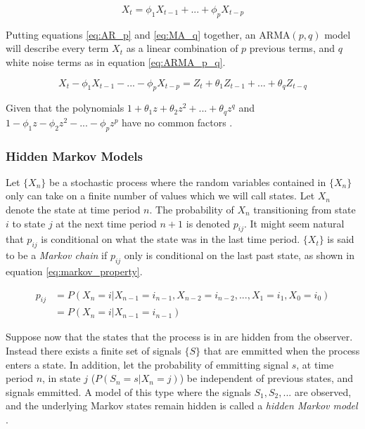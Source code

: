 \begin{equation}
    X_t = \phi_1 X_{t-1} + ... + \phi_p X_{t-p}
    \label{eq:AR_p}
\end{equation}

Putting equations \eqref{eq:AR_p} and \eqref{eq:MA_q} together, an $\mathrm{ARMA}(p,q)$ model will describe every term $X_t$ as a linear combination of $p$ previous terms, and $q$ white noise terms as in equation \eqref{eq:ARMA_p_q}.

\begin{equation}
    X_t - \phi_1 X_{t-1} - ... - \phi_p X_{t-p} = Z_{t} + \theta_1 Z_{t-1} + ... + \theta_q Z_{t-q}
    \label{eq:ARMA_p_q}
\end{equation}

Given that the polynomials $1 + \theta_1 z + \theta_2 z^2 + ... + \theta_q z^q$ and $1 - \phi_1 z - \phi_2 z^2 - ... - \phi_p z^p$ have no common factors \cite{brockwell_davis}.

\subsubsection*{Hidden Markov Models} \label{s:hmm}
Let $\{X_n\}$ be a stochastic process where the random variables contained in $\{X_n\}$ only can take on a finite number of values which we will call states. 
Let $X_n$ denote the state at time period $n$. 
The probability of $X_n$ transitioning from state $i$ to state $j$ at the next time period $n+1$ is denoted $p_{ij}$. 
It might seem natural that $p_{ij}$ is conditional on what the state was in the last time period. 
$\{X_t\}$ is said to be a \textit{Markov chain} if $p_{ij}$ only is conditional on the last past state, as shown in equation \eqref{eq:markov_property}.

\begin{equation}
    \begin{split}
        p_{ij} &= P(X_n = i | X_{n-1} = i_{n-1}, X_{n-2} = i_{n-2},..., X_{1} = i_{1}, X_{0} = i_{0}) \\
        &= P(X_n = i| X_{n-1} = i_{n-1})      
    \end{split}
    \label{eq:markov_property}
\end{equation}

Suppose now that the states that the process is in are hidden from the observer. 
Instead there exists a finite set of signals $\{S\}$ that are emmitted when the process enters a state. 
In addition, let the probability of emmitting signal $s$, at time period $n$, in state $j$ ($P(S_n = s | X_n = j)$) be independent of previous states, and signals emmitted. 
A model of this type where the signals $S_1, S_2, ...$ are observed, and the underlying Markov states remain hidden is called a \textit{hidden Markov model} \cite{stoch_pros}. 

